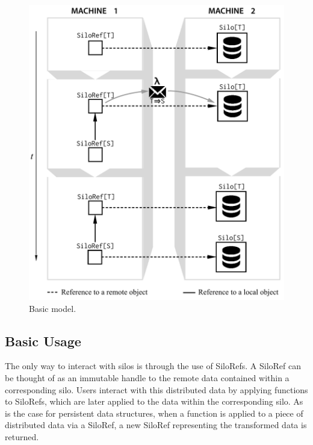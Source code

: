 \documentclass{sigplanconf}
\theoremstyle{definition}
\theoremstyle{definition}
\begin{document}
\begin{figure}[th!]
\includegraphics[width=\columnwidth]{basic-diagram.pdf}
\caption{Basic model.}\label{fig:basic-diagram}
\end{figure}

\subsection{Basic Usage}

The only way to interact with silos is through the use of SiloRefs. A SiloRef
can be thought of as an immutable handle to the remote data contained within a
corresponding silo. Users interact with this distributed data by applying
functions to SiloRefs, which are later applied to the data within the
corresponding silo. As is the case for persistent data structures, when a
function is applied to a piece of distributed data via a SiloRef, a new
SiloRef representing the transformed data is returned.
\end{document}
